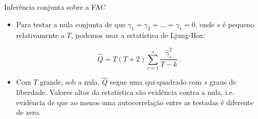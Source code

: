 \documentclass[11pt]{beamer}
\begin{document}
\begin{frame}{Inferência conjunta sobre a FAC}
	\begin{itemize}
	 	\item Para testar a nula conjunta de que $\gamma_{1} = \gamma_{2}=\ldots = \gamma_{s} = 0$, onde $s$ é pequeno relativamente a $T$, podemos usar a {\color{blue}estatística de Ljung-Box}:
		
		$$\hat{Q}= T(T+2)\sum_{r=1}^s \frac{\hat{\gamma}_r^2}{T-k}\, .$$
		\item Com $T$ grande, sob a nula, $\hat{Q}$ segue uma qui-quadrado com $s$ graus de liberdade. Valores altos da estatística são evidência contra a nula, i.e. evidência de que ao menos uma autocorrelação entre as testadas é diferente de zero.
	\end{itemize}
\end{frame}
\end{document}
